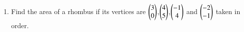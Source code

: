 \renewcommand{\theequation}{\theenumi}
\begin{enumerate}[label=\arabic*.,ref=\thesubsection.\theenumi]
 \item Find the area of a rhombus if its vertices are  
$\begin{pmatrix}3\\0\end{pmatrix}$,$ \begin{pmatrix}4\\5\end{pmatrix}$,$\begin{pmatrix}-1\\4\end{pmatrix}$ and $\begin{pmatrix}-2\\-1\end{pmatrix}$ taken in order.
\end{enumerate}